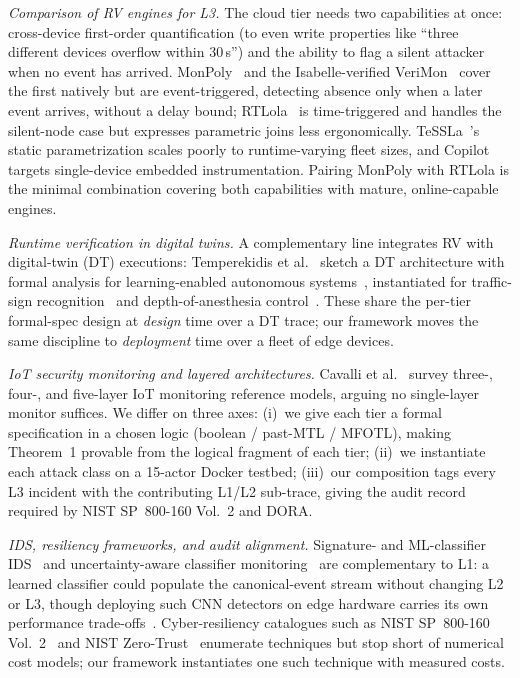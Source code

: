 \documentclass[runningheads]{llncs}
\begin{document}
\emph{Comparison of RV engines for L3.}
The cloud tier needs two capabilities at once: cross-device
first-order quantification (to even write properties like ``three
different devices overflow within 30\,s'') and the ability to flag
a silent attacker when no event has arrived.  MonPoly~\cite{monpoly2014}
and the Isabelle-verified VeriMon~\cite{verimon2021} cover the first
natively but are event-triggered, detecting absence only when a later
event arrives, without a delay bound; RTLola~\cite{rtlola2019} is
time-triggered and handles the silent-node case but expresses
parametric joins less ergonomically.
TeSSLa~\cite{tessla2018,tessla2024}'s static parametrization scales
poorly to runtime-varying fleet sizes, and Copilot~\cite{pike2017copilot}
targets single-device embedded instrumentation.  Pairing MonPoly with
RTLola is the minimal combination covering both capabilities with
mature, online-capable engines.

\emph{Runtime verification in digital twins.}
A complementary line integrates RV with digital-twin (DT)
executions: Temperekidis et al.~\cite{temperekidis2022dt} sketch
a DT architecture with formal analysis for learning-enabled
autonomous systems~\cite{bensalem2024continuous,eleftheriadis2022nnequiv}, instantiated for traffic-sign
recognition~\cite{abdelsalam2024dttraffic} and depth-of-anesthesia
control~\cite{abdelsalam2025dtanesthesia}.  These share the
per-tier formal-spec design at \emph{design} time over a DT
trace; our framework moves the same discipline to \emph{deployment}
time over a fleet of edge devices.

\emph{IoT security monitoring and layered architectures.}
Cavalli et al.~\cite{cavalli2024iotsec} survey
\mbox{three-,} \mbox{four-,} and \mbox{five-layer} IoT
monitoring reference models, arguing no single-layer monitor
suffices.  We differ on three axes:
(i)~we give each tier a formal specification in a chosen logic
(boolean / past-MTL / MFOTL), making Theorem~1 provable from the
logical fragment of each tier; (ii)~we instantiate each attack
class on a 15-actor Docker testbed; (iii)~our composition tags
every L3 incident with the contributing L1/L2 sub-trace, giving
the audit record required by NIST SP~800-160 Vol.~2 and DORA.

\emph{IDS, resiliency frameworks, and audit alignment.}
Signature- and ML-classifier IDS~\cite{santhoshkumar2023mliot} and
uncertainty-aware classifier monitoring~\cite{lukina2021into} are
complementary to L1: a learned classifier could populate the
canonical-event stream without changing L2 or L3, though deploying
such CNN detectors on edge hardware carries its own performance
trade-offs~\cite{chintri2026edge}.  Cyber-resiliency
catalogues such as NIST SP~800-160
Vol.~2~\cite{nist800160v2} and NIST Zero-Trust~\cite{nist800207}
enumerate techniques but
stop short of numerical cost models; our framework instantiates
one such technique with measured costs.
\end{document}
